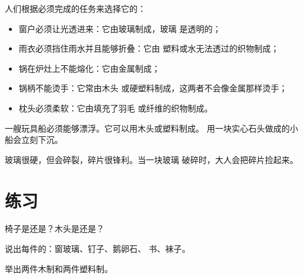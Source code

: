 \begin{proposition}[每种材料都根据其性质来选择]\label{prop:g1:materials-around-us:choose}
人们根据必须完成的任务来选择它的：
\begin{itemize}
  \item 窗户必须让光透进来：它由玻璃制成，玻璃
        是透明的；
  \item 雨衣必须挡住雨水并且能够折叠：它由
        塑料或水无法透过的织物制成；
  \item 锅在炉灶上不能熔化：它由金属制成；
  \item 锅柄不能烫手：它常由木头
        或硬塑料制成，这两者不会像金属那样烫手；
  \item 枕头必须柔软：它由填充了羽毛
        或纤维的织物制成。
\end{itemize}
\end{proposition}

\begin{example}[小船]\label{ex:g1:materials-around-us:boat}
一艘玩具船必须能够漂浮。它可以用木头或塑料制成。
用一块实心石头做成的小船会立刻下沉。
\end{example}

\begin{remark}[打碎的玻璃]\label{rem:g1:materials-around-us:glass}
玻璃很硬，但会碎裂，碎片很锋利。当一块玻璃
破碎时，大人会把碎片捡起来。
\end{remark}

\section{练习}

\begin{exercise}[$\star$]\label{exo:g1:materials-around-us:1}
椅子是还是？木头是还是？
\end{exercise}

\begin{exercise}[$\star$]\label{exo:g1:materials-around-us:2}
说出每件的：窗玻璃、钉子、鹅卵石、
书、袜子。
\end{exercise}

\begin{exercise}[$\star$]\label{exo:g1:materials-around-us:3}
举出两件木制和两件塑料制。
\end{exercise}

